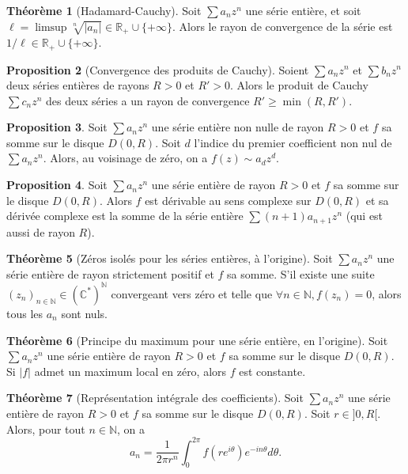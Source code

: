 \documentclass[11pt,a4paper]{article}
\newcommand{\N}{\mathbb{N}}
\newcommand{\R}{\mathbb{R}}
\newcommand{\C}{\mathbb{C}}
\theoremstyle{definition}
\newtheorem{theoreme}{Th\'eor\`eme}[section]
\newtheorem{prop}[theoreme]{Proposition}
\theoremstyle{plain}
\begin{document}
\begin{theoreme}[Hadamard-Cauchy]
Soit $\sum a_nz^n$ une série entière, et soit $\ell = \limsup \sqrt[n]{|a_n|} \in \R_+\cup \{+\infty\}$.
Alors le rayon de convergence de la série est $1/\ell \in \R_+\cup \{+\infty\}$.
\end{theoreme}

\begin{prop}[Convergence des produits de Cauchy]
Soient $\sum a_nz^n$ et $\sum b_nz^n$ deux séries entières de rayons $R>0$ et $R'>0$.
Alors le produit de Cauchy $\sum c_nz^n$ des deux séries a un rayon de convergence $R'\geq \min(R,R')$.
\end{prop}

\begin{prop}
Soit $\sum a_nz^n$ une série entière non nulle de rayon $R>0$ et $f$ sa somme sur le disque $D(0,R)$.
Soit $d$ l'indice du premier coefficient non nul de $\sum a_nz^n$.
Alors, au voisinage de zéro, on a  $f(z)\sim a_dz^d$.
\end{prop}

\begin{prop}
Soit $\sum a_nz^n$ une série entière de rayon $R>0$ et $f$ sa somme sur le disque $D(0,R)$.
Alors $f$ est dérivable au sens complexe sur $D(0,R)$ et sa dérivée complexe est la somme de la série entière $\sum (n+1)a_{n+1}z^n$ (qui est aussi de rayon $R$).
\end{prop}

\begin{theoreme}[Zéros isolés pour les séries entières, à l'origine]
Soit $\sum a_nz^n$ une série entière de rayon strictement positif et $f$ sa somme.
S'il existe une suite $(z_n)_{n\in \N} \in (\C^*)^\N$ convergeant vers zéro et telle que $\forall n\in\N, f(z_n)=0$, alors tous les $a_n$ sont nuls.
\end{theoreme}

\begin{theoreme}[Principe du maximum pour une série entière, en l'origine]
Soit $\sum a_nz^n$ une série entière de rayon $R>0$ et $f$ sa somme sur le disque $D(0,R)$.
Si $|f|$ admet un maximum local en zéro, alors $f$ est constante.
\end{theoreme}

\begin{theoreme}[Représentation intégrale des coefficients]
Soit $\sum a_nz^n$ une série entière de rayon $R>0$ et $f$ sa somme sur le disque $D(0,R)$.
Soit $r \in ]0,R[$.
Alors, pour tout $n\in\N$, on a 
\[a_n = \frac{1}{2\pi r^n}\int_0^{2\pi}f\left(re^{i\theta}\right)e^{-in\theta}d\theta. \]
\end{theoreme}
\end{document}
